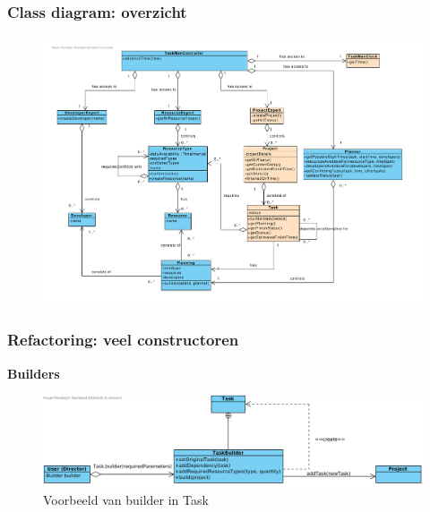 \documentclass{beamer}
\begin{document}
\begin{frame}
\frametitle {Class diagram: overzicht}
\vspace{-1.4cm}
\begin{figure}
\centering
\begin{center}
\includegraphics[width=1.05\textwidth]{figures/Class_diagram_iteratie2.pdf}
\end{center}

\end{figure}
\end{frame}

%
%   
%


\begin{frame}
\frametitle {Refactoring: veel constructoren}
\textbf{Builders}
\begin{figure}
\includegraphics[scale=0.5]{figures/builder}
\caption{Voorbeeld van builder in Task}
\end{figure}

\end{frame}
\end{document}
